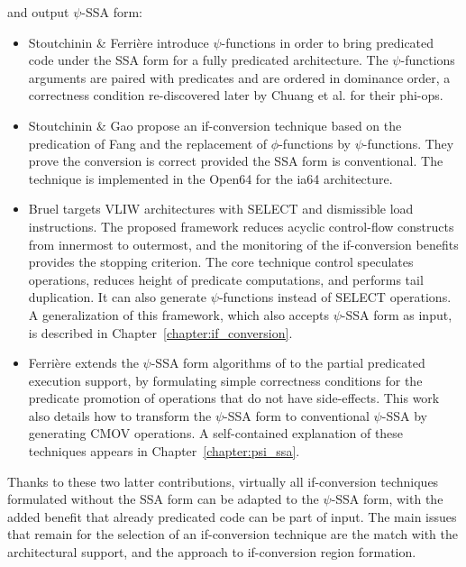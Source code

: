 and output $\psi$-SSA form: \begin{itemize}

\item Stoutchinin \& Ferri\`ere \cite{Stoutchinin:2001:MICRO} introduce
$\psi$-functions in order to bring predicated code under the SSA form for a
fully predicated architecture. The $\psi$-functions arguments are paired with
predicates and are ordered in dominance order, a correctness condition
re-discovered later by Chuang et al. \cite{Chuang:2003:CGO} for their phi-ops.

\item Stoutchinin \& Gao \cite{Stoutchinin:2004:EuroPar} propose an
if-conversion technique based on the predication of Fang \cite{Fang:1996:LCPC}
and the replacement of $\phi$-functions by $\psi$-functions. They prove the
conversion is correct provided the SSA form is conventional. The technique is
implemented in the Open64 for the ia64 architecture.

\item Bruel \cite{Bruel:2006:ODES} targets VLIW architectures with SELECT and
dismissible load instructions. The proposed framework reduces acyclic
control-flow constructs from innermost to outermost, and the monitoring of the
if-conversion benefits provides the stopping criterion. The core technique
control speculates operations, reduces height of predicate computations, and
performs tail duplication. It can also generate $\psi$-functions instead of
SELECT operations. A generalization of this framework, which also accepts
$\psi$-SSA form as input, is described in Chapter~\ref{chapter:if_conversion}.

\item Ferri\`ere \cite{Ferriere:2007:SCOPES} extends the $\psi$-SSA form
algorithms of \cite{Stoutchinin:2001:MICRO} to the partial predicated execution
support, by formulating simple correctness conditions for the predicate
promotion of operations that do not have side-effects. This work also details
how to transform the $\psi$-SSA form to conventional $\psi$-SSA by generating
CMOV operations. A self-contained explanation of these techniques appears in
Chapter~\ref{chapter:psi_ssa}.

\end{itemize}

Thanks to these two latter contributions, virtually all if-conversion techniques
formulated without the SSA form can be adapted to the $\psi$-SSA form, with the
added benefit that already predicated code can be part of input. The main issues
that remain for the selection of an if-conversion technique are the match with
the architectural support, and the approach to if-conversion region formation.

